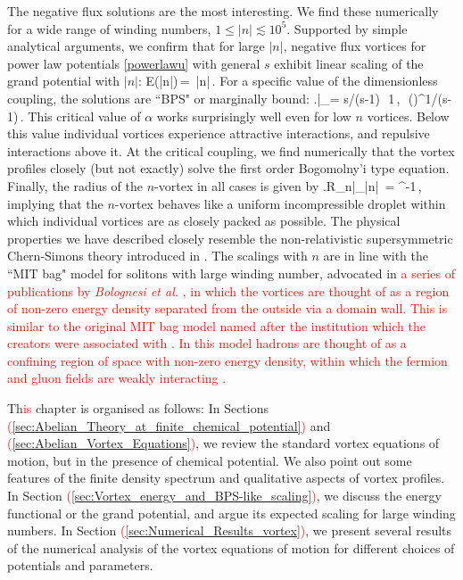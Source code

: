 The negative flux solutions are the most interesting. We find these numerically for a wide range of winding numbers, $1\leq |n| \lesssim 10^5$. Supported by simple analytical arguments, we confirm that for large $|n|$, negative flux vortices for power law potentials \eqref{powerlawu} with general $s$  exhibit linear scaling of the grand potential with $|n|$:
\be
{\cal E}(|n|)\,=\, |n|\,.
\ee
For a specific value of the dimensionless coupling, the solutions are ``BPS" or marginally bound:
\be
\left.\right|_{\alpha = s/(s-1)}\,\to\, 1\,,\qquad \alpha\,\equiv\,
\left(\right)^{1/(s-1)}\,.
\ee
This critical value of $\alpha$ works surprisingly well even for low $n$ vortices. Below this value  individual vortices experience attractive interactions,  and repulsive interactions above it.  At the critical coupling, we find numerically that the vortex profiles closely (but not exactly) solve the first order Bogomolny'i type equation.
Finally, the radius of the $n$-vortex in all cases is given by
\be
\left.R_n\right|_{|n|} \,=\,\,\mu^{-1}\,,
\ee
implying  that the $n$-vortex behaves like a uniform incompressible droplet within which individual vortices are as closely packed as possible. The physical properties we have described  closely resemble the non-relativistic supersymmetric Chern-Simons theory introduced in \cite{Tong:2015xaa}. The scalings with $n$ are in line with the ``MIT bag" model for solitons with large winding number, advocated in \textcolor{red}{a series of publications by \textit{Bolognesi et al.}} \cite{Bolognesi:2005ty, Bolognesi:2005rk, Bolognesi:2007ez}\textcolor{red}{, in which  the vortices are thought of as a region of non-zero energy density separated from the outside via a domain wall. This is similar to the original MIT bag model named after the institution which the creators were associated with \cite{PhysRevD.9.3471}. In this model hadrons are thought of as a confining region of space with non-zero energy density, within which the fermion and gluon fields are weakly interacting .} 

Th\textcolor{red}{is} chapter is organised as follows: In Sections \textcolor{red}{(}\ref{sec:Abelian_Theory_at_finite_chemical_potential}\textcolor{red}{)} and \textcolor{red}{(}\ref{sec:Abelian_Vortex_Equations}\textcolor{red}{)}, we review the  standard vortex equations of motion, but in the presence of chemical potential. We also point out some features of the finite density spectrum and qualitative aspects of vortex profiles.  In Section \textcolor{red}{(}\ref{sec:Vortex_energy_and_BPS-like_scaling}\textcolor{red}{)}, we discuss the energy functional or the grand potential, and argue its expected scaling for large winding numbers. In Section \textcolor{red}{(}\ref{sec:Numerical_Results_vortex}\textcolor{red}{)}, we present several results of the numerical analysis of the vortex equations of motion for different choices of potentials and parameters.
